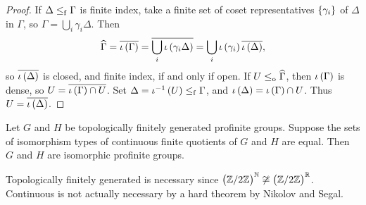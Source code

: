 \begin{proof}
If $ \Delta \le_{\mathrm{f}} \Gamma $ is finite index, take a finite set of coset representatives $ \cbr{\gamma_i} $ of $ \Delta $ in $ \Gamma $, so $ \Gamma = \bigcup_i \gamma_i\Delta $. Then
$$ \widehat{\Gamma} = \overline{\iota\br{\Gamma}} = \overline{\bigcup_i \iota\br{\gamma_i\Delta}} = \bigcup_i \iota\br{\gamma_i}\overline{\iota\br{\Delta}}, $$
so $ \overline{\iota\br{\Delta}} $ is closed, and finite index, if and only if open. If $ U \le_{\mathrm{o}} \widehat{\Gamma} $, then $ \iota\br{\Gamma} $ is dense, so $ U = \overline{\iota\br{\Gamma} \cap U} $. Set $ \Delta = \iota^{-1}\br{U} \le_\f \Gamma $, and $ \iota\br{\Delta} = \iota\br{\Gamma} \cap U $. Thus $ U = \overline{\iota\br{\Delta}} $.
\end{proof}

\begin{theorem}
Let $ G $ and $ H $ be topologically finitely generated profinite groups. Suppose the sets of isomorphism types of continuous finite quotients of $ G $ and $ H $ are equal. Then $ G $ and $ H $ are isomorphic profinite groups.
\end{theorem}

Topologically finitely generated is necessary since $ \br{\ZZ / 2\ZZ}^\NN \not\cong \br{\ZZ / 2\ZZ}^\RR $. Continuous is not actually necessary by a hard theorem by Nikolov and Segal.

